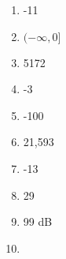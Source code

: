 \documentclass[../uilmath.tex]{subfiles}
\begin{document}
\begin{enumerate}[label=\bfseries\arabic*.]
    \item %
    -11

    \item %
    $(-\infty, 0]$

    \item %
    5172

    \item %
    -3

    \item %
    -100

    \item %
    21,593

    \item %
    -13

    \item %
    29

    \item %
    99 dB

    \item %
    
\end{enumerate}
\end{document}
